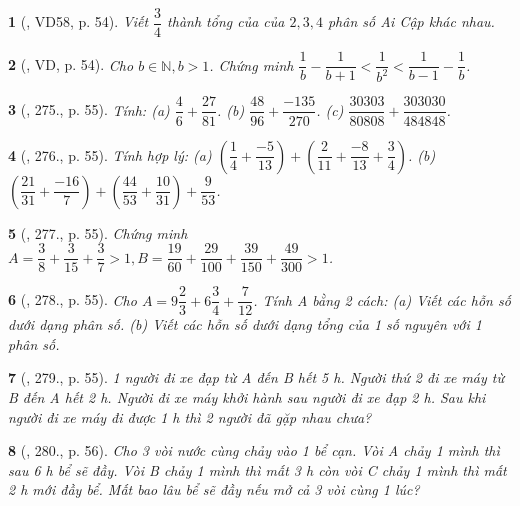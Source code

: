 \documentclass{article}
\newtheorem{baitoan}{}
\begin{document}
\begin{baitoan}[\cite{Tuyen_Toan_6}, VD58, p. 54]
	Viết $\dfrac{3}{4}$ thành tổng của của $2,3,4$ phân số Ai Cập khác nhau.
\end{baitoan}

\begin{baitoan}[\cite{Tuyen_Toan_6}, VD, p. 54]
	Cho $b\in\mathbb{N},b > 1$. Chứng minh $\dfrac{1}{b} - \dfrac{1}{b + 1} < \dfrac{1}{b^2} < \dfrac{1}{b - 1} - \dfrac{1}{b}$.
\end{baitoan}

\begin{baitoan}[\cite{Tuyen_Toan_6}, 275., p. 55]
	Tính: (a) $\dfrac{4}{6} + \dfrac{27}{81}$. (b) $\dfrac{48}{96} + \dfrac{-135}{270}$. (c) $\dfrac{30303}{80808} + \dfrac{303030}{484848}$.
\end{baitoan}

\begin{baitoan}[\cite{Tuyen_Toan_6}, 276., p. 55]
	Tính hợp lý: (a) $\left(\dfrac{1}{4} + \dfrac{-5}{13}\right) + \left(\dfrac{2}{11} + \dfrac{-8}{13} + \dfrac{3}{4}\right)$. (b) $\left(\dfrac{21}{31} + \dfrac{-16}{7}\right) + \left(\dfrac{44}{53} + \dfrac{10}{31}\right) + \dfrac{9}{53}$.
\end{baitoan}

\begin{baitoan}[\cite{Tuyen_Toan_6}, 277., p. 55]
	Chứng minh $A = \dfrac{3}{8} + \dfrac{3}{15} + \dfrac{3}{7} > 1,B = \dfrac{19}{60} + \dfrac{29}{100} + \dfrac{39}{150} + \dfrac{49}{300} > 1$.
\end{baitoan}

\begin{baitoan}[\cite{Tuyen_Toan_6}, 278., p. 55]
	Cho $A = 9\dfrac{2}{3} + 6\dfrac{3}{4} + \dfrac{7}{12}$. Tính A bằng 2 cách: (a) Viết các hỗn số dưới dạng phân số. (b) Viết các hỗn số dưới dạng tổng của 1 số nguyên với 1 phân số.
\end{baitoan}

\begin{baitoan}[\cite{Tuyen_Toan_6}, 279., p. 55]
	1 người đi xe đạp từ A đến B hết {\rm5 h}. Người thứ 2 đi xe máy từ B đến A hết {\rm2 h}. Người đi xe máy khởi hành sau người đi xe đạp {\rm2 h}. Sau khi người đi xe máy đi được {\rm1 h} thì 2 người đã gặp nhau chưa?
\end{baitoan}

\begin{baitoan}[\cite{Tuyen_Toan_6}, 280., p. 56]
	Cho 3 vòi nước cùng chảy vào 1 bể cạn. Vòi A chảy 1 mình thì sau {\rm6 h} bể sẽ đầy. Vòi B chảy 1 mình thì mất {\rm3 h} còn vòi C chảy 1 mình thì mất {\rm2 h} mới đầy bể. Mất bao lâu bể sẽ đầy nếu mở cả 3 vòi cùng 1 lúc?
\end{baitoan}
\end{document}
